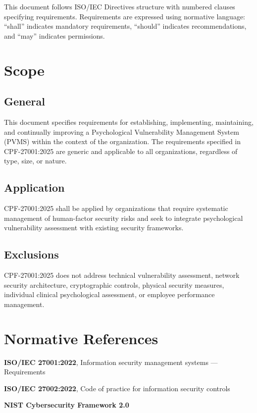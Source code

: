 \documentclass[11pt,a4paper]{article}
\begin{document}
This document follows ISO/IEC Directives structure with numbered clauses specifying requirements. Requirements are expressed using normative language: ``shall'' indicates mandatory requirements, ``should'' indicates recommendations, and ``may'' indicates permissions.

\section{Scope}

\subsection{General}

This document specifies requirements for establishing, implementing, maintaining, and continually improving a Psychological Vulnerability Management System (PVMS) within the context of the organization. The requirements specified in CPF-27001:2025 are generic and applicable to all organizations, regardless of type, size, or nature.

\subsection{Application}

CPF-27001:2025 shall be applied by organizations that require systematic management of human-factor security risks and seek to integrate psychological vulnerability assessment with existing security frameworks.

\subsection{Exclusions}

CPF-27001:2025 does not address technical vulnerability assessment, network security architecture, cryptographic controls, physical security measures, individual clinical psychological assessment, or employee performance management.

\section{Normative References}

\textbf{ISO/IEC 27001:2022}, Information security management systems — Requirements

\textbf{ISO/IEC 27002:2022}, Code of practice for information security controls

\textbf{NIST Cybersecurity Framework 2.0}
\end{document}
